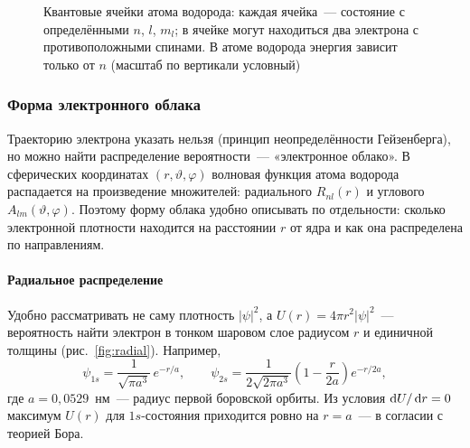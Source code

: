 \begin{figure}[ht]
\centering
{}
\caption{Квантовые ячейки атома водорода: каждая ячейка~— состояние с
определёнными $n$, $l$, $m_l$; в ячейке могут находиться два электрона с
противоположными спинами. В атоме водорода энергия зависит только от $n$
(масштаб по вертикали условный)}
\label{fig:H-cells}
\end{figure}

\subsubsection{Форма электронного облака}

Траекторию электрона указать нельзя (принцип неопределённости
Гейзенберга), но можно найти распределение вероятности~— «электронное
облако». В сферических координатах $(r,\vartheta,\varphi)$ волновая
функция атома водорода распадается на произведение множителей:
радиального $R_{nl}(r)$ и углового $A_{lm}(\vartheta,\varphi)$. Поэтому
форму облака удобно описывать по отдельности: сколько электронной
плотности находится на расстоянии $r$ от ядра и как она распределена по
направлениям.

\paragraph{Радиальное распределение}
Удобно рассматривать не саму плотность $|\psi|^2$, а
 $U(r)=4\pi r^2|\psi|^2$~— вероятность найти
электрон в тонком шаровом слое радиусом $r$ и единичной толщины
(рис.~\ref{fig:radial}). Например,
\[
\psi_{1s}=\frac1{\sqrt{\pi a^3}}\,e^{-r/a},\qquad
\psi_{2s}=\frac1{2\sqrt{2\pi a^3}}\left(1-\frac r{2a}\right)e^{-r/2a},
\]
где $a=0{,}0529$~нм~— радиус первой боровской орбиты. Из условия
$\mathop{}\!\mathrm{d} U/\mathop{}\!\mathrm{d} r=0$ максимум $U(r)$ для $1s$-состояния приходится ровно на
$r=a$~— в согласии с теорией Бора.

